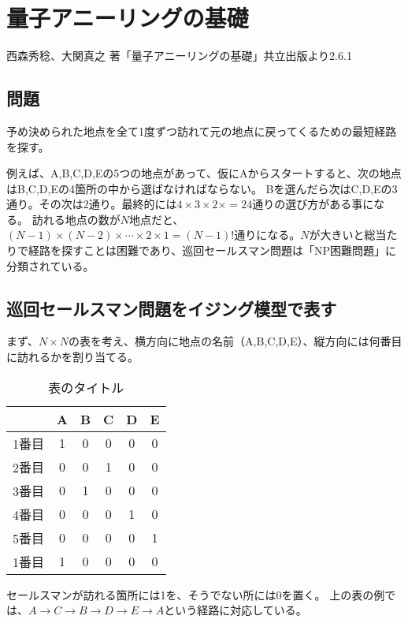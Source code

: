 \chapter{量子アニーリングの基礎}

\cite{b1} 西森秀稔、大関真之 著「量子アニーリングの基礎」共立出版より2.6.1

\section{問題}

予め決められた地点を全て1度ずつ訪れて元の地点に戻ってくるための最短経路を探す。

例えば、A,B,C,D,Eの5つの地点があって、仮にAからスタートすると、次の地点はB,C,D,Eの4箇所の中から選ばなければならない。
Bを選んだら次はC,D,Eの3通り。その次は2通り。最終的には$4\times 3\times 2\times = 24$通りの選び方がある事になる。
訪れる地点の数が$N$地点だと、$(N-1)\times(N-2)\times\cdots\times2\times1=(N-1)!$通りになる。$N$が大きいと総当たりで経路を探すことは困難であり、巡回セールスマン問題は「NP困難問題」に分類されている。

\section{巡回セールスマン問題をイジング模型で表す}

まず、$N\times N$の表を考え、横方向に地点の名前（A,B,C,D,E）、縦方向には何番目に訪れるかを割り当てる。

\begin{table}[h]
  \centering
  \caption{表のタイトル}
  \label{tab:hogehoge}
  \begin{tabular}{c|ccccc}
          & A & B & C & D & E \\\hline
    1番目  & 1 & 0 & 0 & 0 & 0 \\
    2番目  & 0 & 0 & 1 & 0 & 0 \\
    3番目  & 0 & 1 & 0 & 0 & 0 \\
    4番目  & 0 & 0 & 0 & 1 & 0 \\
    5番目  & 0 & 0 & 0 & 0 & 1 \\\hline
    1番目  & 1 & 0 & 0 & 0 & 0 \\
  \end{tabular}
\end{table}

セールスマンが訪れる箇所には1を、そうでない所には0を置く。
上の表の例では、$A\rightarrow C\rightarrow B\rightarrow D\rightarrow E\rightarrow A$という経路に対応している。

